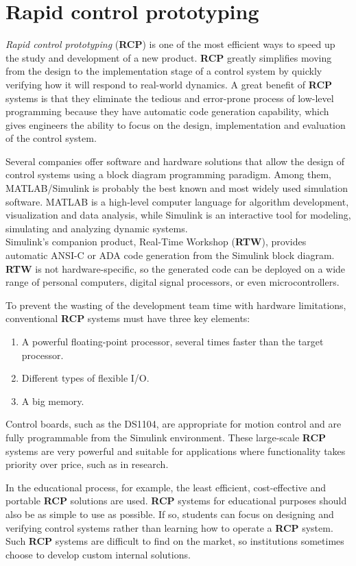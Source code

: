 
\section{Rapid control prototyping}

\emph{Rapid control prototyping} (\textbf{RCP}) is one of the most efficient ways to speed up the study and development of a new product. \textbf{RCP} greatly simplifies moving from the design to the implementation stage of a control system by quickly verifying how it will respond to real-world dynamics.\cite{RCP}\newline
A great benefit of \textbf{RCP} systems is that they eliminate the tedious and error-prone process of low-level programming because they have automatic code generation capability, which gives engineers the ability to focus on the design, implementation and evaluation of the control system.\par
Several companies offer software and hardware solutions that allow the design of control systems using a block diagram programming paradigm.
Among them, MATLAB/Simulink is probably the best known and most widely used simulation software. MATLAB is a high-level computer language for algorithm development, visualization and data analysis, while Simulink is an interactive tool for modeling, simulating and analyzing dynamic systems.\\
Simulink's companion product, Real-Time Workshop (\textbf{RTW}), provides automatic ANSI-C or ADA code generation from the Simulink block diagram. \textbf{RTW} is not hardware-specific, so the generated code can be deployed on a wide range of personal computers, digital signal processors, or even microcontrollers.\par
To prevent the wasting of the development team time with hardware limitations, conventional \textbf{RCP} systems must have three key elements: \begin{enumerate}
    \item A powerful floating-point processor, several times faster than the target processor.
    \item Different types of flexible I/O.
    \item A big memory.
\end{enumerate}
Control boards, such as the DS1104, are appropriate for motion control and are fully programmable from the Simulink environment. These large-scale \textbf{RCP} systems are very powerful and suitable for applications where functionality takes priority over price, such as in research.\par
In the educational process, for example, the least efficient, cost-effective and portable \textbf{RCP} solutions are used. \textbf{RCP} systems for educational purposes should also be as simple to use as possible. If so, students can focus on designing and verifying control systems rather than learning how to operate a \textbf{RCP} system. Such \textbf{RCP} systems are difficult to find on the market, so institutions sometimes choose to develop custom internal solutions.\\